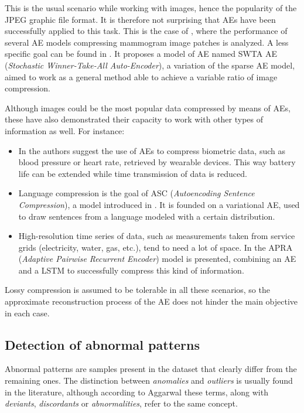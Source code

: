 This is the usual scenario while working with images, hence the popularity of the JPEG  graphic file format. It is therefore not surprising that AEs have been successfully applied to this task. This is the case of , where the performance of several AE models compressing mammogram image patches is analyzed. A less specific goal can be found in . It proposes a model of AE named SWTA AE (\textit{Stochastic Winner-Take-All Auto-Encoder}), a variation of the sparse AE model, aimed to work as a general method able to achieve a variable ratio of image compression.

Although images could be the most popular data compressed by means of AEs, these have also demonstrated their capacity to work with other types of information as well. For instance:
\begin{itemize}
    \item In   the authors suggest the use of AEs to compress biometric data, such as blood pressure or heart rate, retrieved by wearable devices. This way  battery life can be extended while time transmission of data is reduced. 
    
    \item Language compression is the goal of ASC (\textit{Autoencoding Sentence Compression}), a model introduced in . It is founded on a variational AE, used to draw sentences from a language modeled with a certain distribution.
    
    \item High-resolution time series of data, such as measurements taken from service grids (electricity, water, gas, etc.), tend to need a lot of space. In  the APRA (\textit{Adaptive Pairwise Recurrent Encoder}) model is presented, combining an AE and a LSTM to successfully compress this kind of information.
\end{itemize}

Lossy compression is assumed to be tolerable in all these scenarios, so the approximate reconstruction process of the AE does not hinder the main objective in each case.

\subsection{Detection of abnormal patterns}
Abnormal patterns are samples present in the dataset that clearly differ from the remaining ones. The distinction between \textit{anomalies} and \textit{outliers} is usually found in the literature, although according to Aggarwal  these terms, along with \textit{deviants}, \textit{discordants} or \textit{abnormalities}, refer to the same concept.

